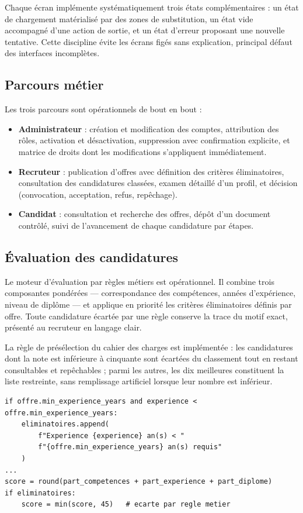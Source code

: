 \documentclass[11pt,a4paper]{article}
\begin{document}
Chaque écran implémente systématiquement trois états complémentaires : un état de chargement matérialisé par des zones de substitution, un état vide accompagné d'une action de sortie, et un état d'erreur proposant une nouvelle tentative. Cette discipline évite les écrans figés sans explication, principal défaut des interfaces incomplètes.

\subsection{Parcours métier}
Les trois parcours sont opérationnels de bout en bout :
\begin{itemize}[leftmargin=1.5em, nosep]
  \item \textbf{Administrateur} : création et modification des comptes, attribution des rôles, activation et désactivation, suppression avec confirmation explicite, et matrice de droits dont les modifications s'appliquent immédiatement.
  \item \textbf{Recruteur} : publication d'offres avec définition des critères éliminatoires, consultation des candidatures classées, examen détaillé d'un profil, et décision (convocation, acceptation, refus, repêchage).
  \item \textbf{Candidat} : consultation et recherche des offres, dépôt d'un document contrôlé, suivi de l'avancement de chaque candidature par étapes.
\end{itemize}

\subsection{Évaluation des candidatures}
Le moteur d'évaluation par règles métiers est opérationnel. Il combine trois composantes pondérées — correspondance des compétences, années d'expérience, niveau de diplôme — et applique en priorité les critères éliminatoires définis par offre. Toute candidature écartée par une règle conserve la trace du motif exact, présenté au recruteur en langage clair.

La règle de présélection du cahier des charges est implémentée : les candidatures dont la note est inférieure à cinquante sont écartées du classement tout en restant consultables et repêchables ; parmi les autres, les dix meilleures constituent la liste restreinte, sans remplissage artificiel lorsque leur nombre est inférieur.

\begin{lstlisting}[caption={Extrait du moteur : les critères éliminatoires sont tracés avec leur motif.}]
if offre.min_experience_years and experience < offre.min_experience_years:
    eliminatoires.append(
        f"Experience {experience} an(s) < "
        f"{offre.min_experience_years} an(s) requis"
    )
...
score = round(part_competences + part_experience + part_diplome)
if eliminatoires:
    score = min(score, 45)   # ecarte par regle metier
\end{lstlisting}
\end{document}
